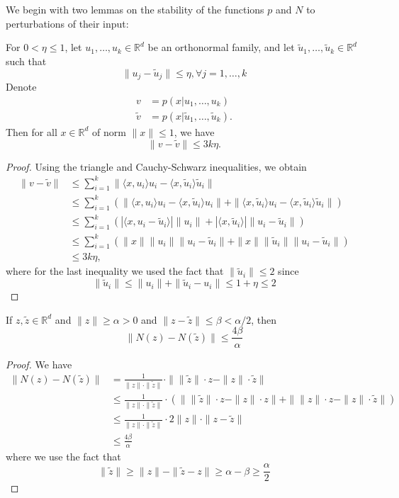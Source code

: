 \documentclass[twoside,11pt]{article}
\newcommand{\RR}{\mathbb{R}}
\begin{document}
We begin with two lemmas on the stability of the functions $p$ and $N$ to perturbations of their input:
\begin{lem}\label{lem:p}
For $0< \eta \leq 1$, let $u_1,\ldots,u_k \in \RR^d$ be an orthonormal family, and let $\tilde u_1,\ldots,\tilde u_k\in \RR^d$ such that 
$$\|u_j-\tilde u_j\|\le \eta, \forall j=1,\ldots,k $$
Denote 
\begin{align*}
v&=p(x|u_1,\ldots,u_k)\\
\tilde v&=p(x|\tilde u_1,\ldots,\tilde u_k).
\end{align*}
Then for all $x\in \RR^d$ of norm $\|x\|\leq 1$, we have 
$$\|v-\tilde v\|\leq 3k\eta .$$
\end{lem}
\begin{proof}
Using the triangle and Cauchy-Schwarz inequalities, we obtain
\begin{align*}
\|v-\tilde v\|&\leq \sum_{i=1}^k \| \langle x,u_i\rangle u_i-\langle x,\tilde{u}_i\rangle \tilde{u}_i\| \\
&\leq \sum_{i=1}^k \left(  \|\langle x,u_i \rangle u_i-\langle x,\tilde{u}_i \rangle u_i\|+ \|\langle x,\tilde u_i \rangle u_i-\langle x,\tilde{u}_i \rangle \tilde u_i\| \right) \\
&\leq \sum_{i=1}^k \left( |\langle x,u_i-\tilde u_i \rangle| \|u_i\|+|\langle x,\tilde u_i 
\rangle|\|u_i -\tilde u_i\|\right)\\
&\leq \sum_{i=1}^k \left(\|x\| \|u_i\| \|u_i-\tilde u_i\|+\|x\| \|\tilde{u}_i\| \|u_i-\tilde u_i\| \right)\\
&\leq 3k\eta,
\end{align*}
where for the last inequality we used the fact that $\|\tilde u_i\|\leq 2 $ since 
$$\|\tilde u_i\|\leq \|u_i\|+\|\tilde u_i-u_i\|\leq 1+\eta\leq 2$$
\end{proof}
\begin{lem}\label{lem:N}
If $z,\tilde{z}\in \RR^d$ and $\|z\|\geq \alpha > 0$ and $\|z-\tilde z\|\leq \beta<\alpha/2$, then 
$$\|N(z)-N(\tilde{z}) \|\leq \frac{4\beta}{\alpha} $$
\end{lem}
\begin{proof}
We have 
\begin{align*}
\|N(z)-N(\tilde z)\|&=\frac{1}{\|z\|\cdot \|\tilde z\|}\cdot \| \|\tilde z\|\cdot z-\|z\| \cdot \tilde z \|\\
&\leq \frac{1}{\|z\|\cdot \|\tilde z\|}  \cdot \left(\| \|\tilde z\| \cdot z-\|z\|\cdot z\|+\|\|z\| \cdot  z-\|z\| \cdot \tilde z \| \right)\\
&\leq \frac{1}{\|z\|\cdot \|\tilde z\|} \cdot 2\|z\| \cdot \|z-\tilde z\|\\
&\leq \frac{4 \beta}{\alpha}
\end{align*}
where we use the fact that 
$$\|\tilde z\| \geq \|z\|-\|\tilde z -z\| \geq \alpha -\beta \geq \frac{\alpha}{2} $$
\end{proof}
\end{document}
